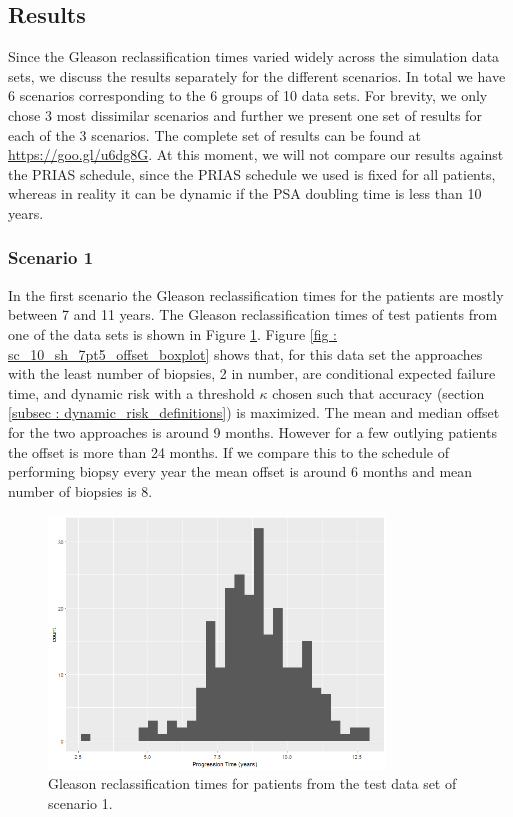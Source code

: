 \subsection{Results}
Since the Gleason reclassification times varied widely across the simulation data sets, we discuss the results separately for the different scenarios. In total we have 6 scenarios corresponding to the 6 groups of 10 data sets. For brevity, we only chose 3 most dissimilar scenarios and further we present one set of results for each of the 3 scenarios. The complete set of results can be found at \url{https://goo.gl/u6dg8G}. At this moment, we will not compare our results against the PRIAS schedule, since the PRIAS schedule we used is fixed for all patients, whereas in reality it can be dynamic if the PSA doubling time is less than 10 years.

\subsubsection{Scenario 1}
In the first scenario the Gleason reclassification times for the patients are mostly between 7 and 11 years. The Gleason reclassification times of test patients from one of the data sets is shown in Figure \ref{fig : sc_10_sh_7pt5_progression_hist}. Figure \ref{fig : sc_10_sh_7pt5_offset_boxplot} shows that, for this data set the approaches with the least number of biopsies, 2 in number, are conditional expected failure time, and dynamic risk with a threshold $\kappa$ chosen such that accuracy (section \ref{subsec : dynamic_risk_definitions}) is maximized. The mean and median offset for the two approaches is around 9 months. However for a few outlying patients the offset is more than 24 months. If we compare this to the schedule of performing biopsy every year the mean offset is around 6 months and mean number of biopsies is 8. 

\begin{figure}[H]
\centering
\captionsetup{justification=centering}
\includegraphics[width=0.8\textwidth]{sim_study_res_sc_10_sh_7pt5/progression_hist.png}
\caption{\label{fig : sc_10_sh_7pt5_progression_hist} Gleason reclassification times for patients from the test data set of scenario 1.}
\end{figure}

